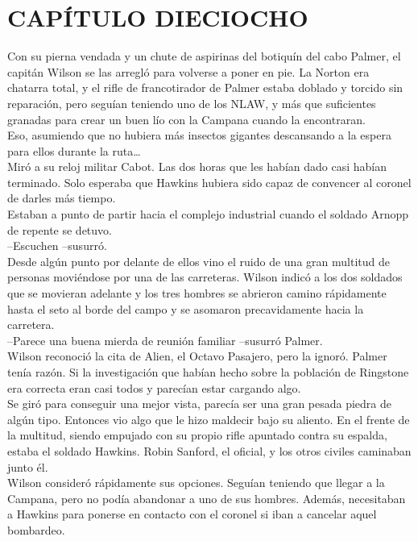 \chapter*{CAPÍTULO DIECIOCHO}
Con su pierna vendada y un chute de aspirinas del botiquín del cabo
Palmer, el capitán Wilson se las arregló para volverse a poner en pie.
La Norton era chatarra total, y el rifle de francotirador de Palmer
estaba doblado y torcido sin reparación, pero seguían teniendo uno de
los NLAW, y más que suficientes granadas para crear un buen lío con la
Campana cuando la encontraran.\\
Eso, asumiendo que no hubiera más insectos gigantes descansando a la
espera para ellos durante la ruta\ldots{}\\
Miró a su reloj militar Cabot. Las dos horas que les habían dado casi
habían terminado. Solo esperaba que Hawkins hubiera sido capaz de
convencer al coronel de darles más tiempo.\\
Estaban a punto de partir hacia el complejo industrial cuando el soldado
Arnopp de repente se detuvo.\\
--Escuchen --susurró.\\
Desde algún punto por delante de ellos vino el ruido de una gran
multitud de personas moviéndose por una de las carreteras. Wilson indicó
a los dos soldados que se movieran adelante y los tres hombres se
abrieron camino rápidamente hasta el seto al borde del campo y se
asomaron precavidamente hacia la carretera.\\
--Parece una buena mierda de reunión familiar --susurró Palmer.\\
Wilson reconoció la cita de Alien, el Octavo Pasajero, pero la ignoró.
Palmer tenía razón. Si la investigación que habían hecho sobre la
población de Ringstone era correcta eran casi todos y parecían estar
cargando algo.\\
Se giró para conseguir una mejor vista, parecía ser una gran pesada
piedra de algún tipo. Entonces vio algo que le hizo maldecir bajo su
aliento. En el frente de la multitud, siendo empujado con su propio
rifle apuntado contra su espalda, estaba el soldado Hawkins. Robin
Sanford, el oficial, y los otros civiles caminaban junto él.\\
Wilson consideró rápidamente sus opciones. Seguían teniendo que llegar a
la Campana, pero no podía abandonar a uno de sus hombres. Además,
necesitaban a Hawkins para ponerse en contacto con el coronel si iban a
cancelar aquel bombardeo.\\
